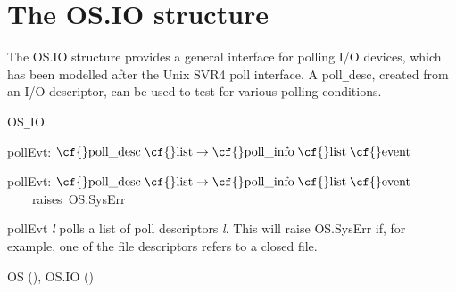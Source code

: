\maybeclearpage
\section{The {\cf OS.\-IO} structure}


  The {\cf \small OS.\-IO} structure provides a general interface for polling I/O devices, which has been modelled after the Unix SVR4 poll interface.  A {\cf \small poll{\tt\_}\linebreak[0]desc}, created from an I/O descriptor, can be used to test for various polling conditions. 
\begin{synopsis}
\item {} \label{sig-CML_OS_IO}
\item {\STRUCTURE} \label{str-OS.IO}
\end{synopsis}

\begin{interface}
\Nopagebreak
\item {}{\cf OS{\tt\_}\linebreak[0]IO}\Nopagebreak
\item {}{} {\cf pollEvt: \(\mbox{\cf{}poll\_desc}\;\mbox{\cf{}list}\rightarrow \mbox{\cf{}poll\_info}\;\mbox{\cf{}list}\;\mbox{\cf{}event}\)}

\end{interface}

\begin{descr}
\item {}{} {\cf pollEvt: \(\mbox{\cf{}poll\_desc}\;\mbox{\cf{}list}\rightarrow \mbox{\cf{}poll\_info}\;\mbox{\cf{}list}\;\mbox{\cf{}event}\)}\label{val-CML_OS_IO.pollEvt}\linebreak[3]\hspace*{\fill}\mbox{~~~~\textrm{raises}~{\cf OS.\-Sys\-Err}}


\begin{speccomment}
\item {\cf \small poll\-Evt \mbox{\cf \small \textit{l}}         } 
polls a list of poll descriptors \mbox{\cf \small \textit{l}}. 	This will raise {\cf \small OS.\-Sys\-Err} if, for example, 	one of the file descriptors refers to a closed file.\end{speccomment}
\end{descr}

\begin{seealso}
{\cf OS} (\pageref{str-OS}), {\cf OS.\-IO} (\pageref{str-CML_OS.IO})
\end{seealso}
